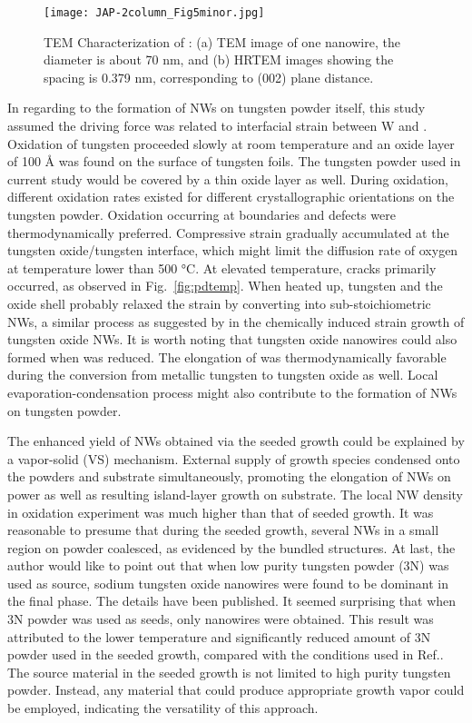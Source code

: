 \begin{figure}[htb]
\centering
\texttt{[image: JAP-2column\_Fig5minor.jpg]}
\caption[Characterization of : TEM cont]{TEM Characterization of : (a) TEM image of one nanowire, the diameter is about 70 nm, and (b) HRTEM images showing the spacing is 0.379 nm, corresponding to (002) plane distance.}
\label{fig:woseedtem2}
\end{figure}

In regarding to the formation of NWs on tungsten powder itself, this study assumed the driving force was related to interfacial strain between W and . Oxidation of tungsten proceeded slowly at room temperature and an oxide layer of 100 \si{\angstrom} was found on the surface of tungsten foils.\cite{Warren1996} The tungsten powder used in current study would be covered by a thin oxide layer as well. During oxidation, different oxidation rates existed for different crystallographic orientations on the tungsten powder. Oxidation occurring at boundaries and defects were thermodynamically preferred.\cite{You2010} Compressive strain gradually accumulated at the tungsten oxide/tungsten interface, which might limit the diffusion rate of oxygen at temperature lower than 500 \si{\degreeCelsius}.\cite{tungsten1999} At elevated temperature, cracks primarily occurred, as observed in Fig.~\ref{fig:pdtemp}. When heated up, tungsten and the oxide shell probably relaxed the strain by converting into sub-stoichiometric NWs, a similar process as suggested by \citeauthor{Klinke2005} in the chemically induced strain growth of tungsten oxide NWs.\cite{Klinke2005} It is worth noting that tungsten oxide nanowires could also formed when  was reduced.\cite{Sarin1975} The elongation of  was thermodynamically favorable during the conversion from metallic tungsten to tungsten oxide as well. Local evaporation-condensation process might also contribute to the formation of NWs on tungsten powder.

The enhanced yield of NWs obtained via the seeded growth could be explained by a vapor-solid (VS) mechanism. External supply of growth species condensed onto the powders and substrate simultaneously, promoting the elongation of NWs on power as well as resulting island-layer growth on substrate. The local NW density in oxidation experiment was much higher than that of seeded growth. It was reasonable to presume that during the seeded growth, several NWs in a small region on powder coalesced, as evidenced by the bundled structures. At last, the author would like to point out that when low purity tungsten powder (3N) was used as source, sodium tungsten oxide nanowires were found to be dominant in the final phase. The details have been published.\cite{Sheng2014} It seemed surprising that when 3N powder was used as seeds, only  nanowires were obtained. This result was attributed to the lower temperature and significantly reduced amount of 3N powder used in the seeded growth, compared with the conditions used in Ref.\cite{Sheng2014}. The source material in the seeded growth is not limited to high purity tungsten powder. Instead, any material that could produce appropriate growth vapor could be employed, indicating the versatility of this approach.

